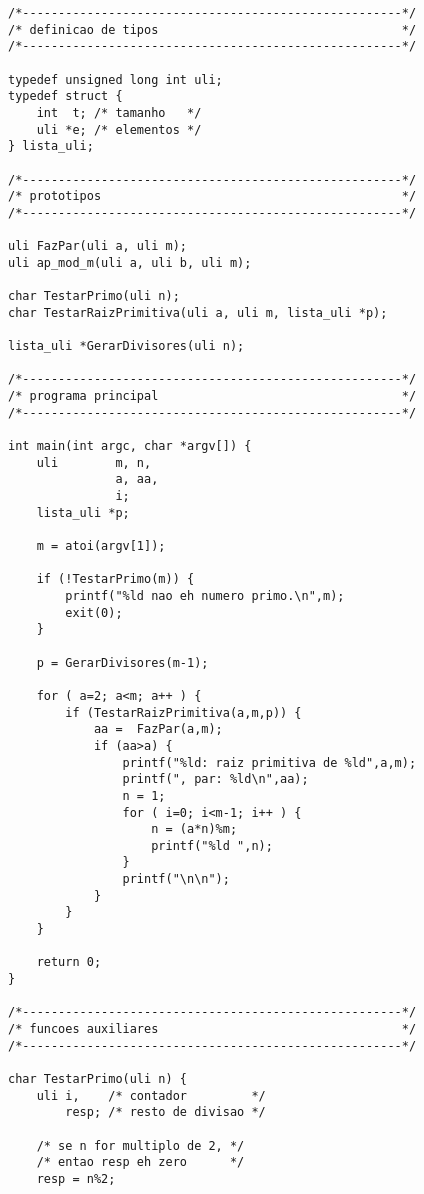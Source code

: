 \documentclass[a4paper,12pt,oneside,onecolumn]{uerj/uerj}
\begin{document}
\begin{verbatim}
/*-----------------------------------------------------*/
/* definicao de tipos                                  */
/*-----------------------------------------------------*/

typedef unsigned long int uli;
typedef struct {
    int  t; /* tamanho   */
    uli *e; /* elementos */
} lista_uli;

/*-----------------------------------------------------*/
/* prototipos                                          */
/*-----------------------------------------------------*/

uli FazPar(uli a, uli m);
uli ap_mod_m(uli a, uli b, uli m);

char TestarPrimo(uli n);
char TestarRaizPrimitiva(uli a, uli m, lista_uli *p);

lista_uli *GerarDivisores(uli n);

/*-----------------------------------------------------*/
/* programa principal                                  */
/*-----------------------------------------------------*/

int main(int argc, char *argv[]) {
    uli        m, n,
               a, aa,
               i;
    lista_uli *p;

    m = atoi(argv[1]);

    if (!TestarPrimo(m)) {
        printf("%ld nao eh numero primo.\n",m);
        exit(0);
    }

    p = GerarDivisores(m-1);

    for ( a=2; a<m; a++ ) {
        if (TestarRaizPrimitiva(a,m,p)) {
            aa =  FazPar(a,m);
            if (aa>a) {
                printf("%ld: raiz primitiva de %ld",a,m);
                printf(", par: %ld\n",aa);
                n = 1;
                for ( i=0; i<m-1; i++ ) {
                    n = (a*n)%m;
                    printf("%ld ",n);
                }
                printf("\n\n");
            }
        }
    }

    return 0;
}

/*-----------------------------------------------------*/
/* funcoes auxiliares                                  */
/*-----------------------------------------------------*/

char TestarPrimo(uli n) {
    uli i,    /* contador         */
        resp; /* resto de divisao */

    /* se n for multiplo de 2, */
    /* entao resp eh zero      */
    resp = n%2;


\end{verbatim}
\end{document}
